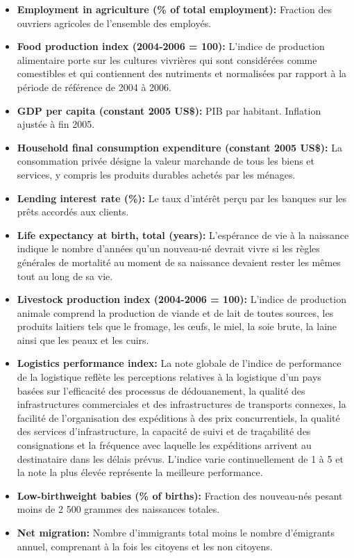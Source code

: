 \begin{itemize}
		\item \textbf{ Employment in agriculture (\% of total employment):} Fraction des ouvriers agricoles de l'ensemble des employés.
		\item \textbf{ Food production index (2004-2006 = 100):} L'indice de production alimentaire porte sur les cultures vivrières qui sont considérées comme comestibles et qui contiennent des nutriments et normalisées par rapport à la période de référence de 2004 à 2006.
		\item \textbf{ GDP per capita (constant 2005 US\$):} PIB par habitant. Inflation ajustée à fin 2005.
		\item \textbf{ Household final consumption expenditure (constant 2005 US\$):}  La consommation privée désigne la valeur marchande de tous les biens et services, y compris les produits durables achetés par les ménages.
		\item \textbf{ Lending interest rate (\%):} Le taux d'intérêt perçu par les banques sur les prêts accordés aux clients.	
		\item \textbf{ Life expectancy at birth, total (years):} L'espérance de vie à la naissance indique le nombre d'années qu'un nouveau-né devrait vivre si les règles générales de mortalité au moment de sa naissance devaient rester les mêmes tout au long de sa vie.
		\item \textbf{ Livestock production index (2004-2006 = 100):} L'indice de production animale comprend la production de viande et de lait de toutes sources, les produits laitiers tels que le fromage, les œufs, le miel, la soie brute, la laine ainsi que les peaux et les cuirs.
		\item \textbf{ Logistics performance index:} La note globale de l'indice de performance de la logistique reflète les perceptions relatives à la logistique d'un pays basées sur l'efficacité des processus de dédouanement, la qualité des infrastructures commerciales et des infrastructures de transports connexes, la facilité de l'organisation des expéditions à des prix concurrentiels, la qualité des services d'infrastructure, la capacité de suivi et de traçabilité des consignations et la fréquence avec laquelle les expéditions arrivent au destinataire dans les délais prévus. L'indice varie continuellement de 1 à 5 et la note la plus élevée représente la meilleure performance.
		\item \textbf{ Low-birthweight babies (\% of births):} Fraction des nouveau-nés pesant moins de 2 500 grammes des naissances totales.
		\item \textbf{ Net migration:} Nombre d'immigrants total moins le nombre d'émigrants annuel, comprenant à la fois les citoyens et les non citoyens.

\end{itemize}
